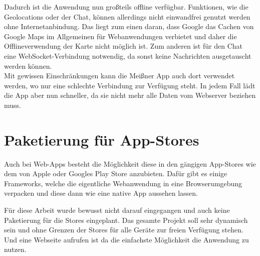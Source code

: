 Dadurch ist die Anwendung nun großteils offline verfügbar. Funktionen, wie die Geolocations oder der Chat, können allerdings nicht einwandfrei genutzt werden ohne Internetanbindung. Das liegt zum einen daran, dass Google das Cachen von Google Maps im Allgemeinen für Webanwendungen verbietet \cite{google:mapsforbidden} und daher die Offlineverwendung der Karte nicht möglich ist. Zum anderen ist für den Chat eine WebSocket-Verbindung notwendig, da sonst keine Nachrichten ausgetauscht werden können.\\
Mit gewissen Einschränkungen kann die Meißner App auch dort verwendet werden, wo nur eine schlechte Verbindung zur Verfügung steht. In jedem Fall lädt die App aber nun schneller, da sie nicht mehr alle Daten vom Webserver beziehen muss.







\section{Paketierung für App-Stores}
Auch bei Web-Apps besteht die Möglichkeit diese in den gängigen App-Stores wie dem von Apple oder Googles Play Store anzubieten. Dafür gibt es einige Frameworks, welche die eigentliche Webanwendung in eine Browserumgebung verpacken und diese dann wie eine native App aussehen lassen.\par
Für diese Arbeit wurde bewusst nicht darauf eingegangen und auch keine Paketierung für die Stores eingeplant. Das gesamte Projekt soll sehr dynamisch sein und ohne Grenzen der Stores für alle Geräte zur freien Verfügung stehen. Und eine Webseite aufrufen ist da die einfachste Möglichkeit die Anwendung zu nutzen.

